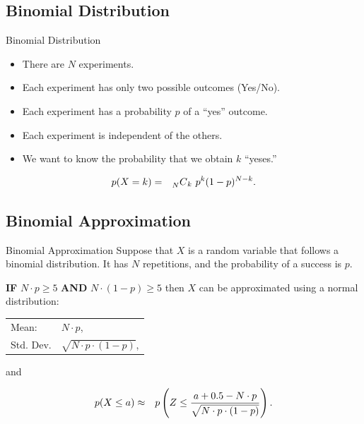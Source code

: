 \subsection{Binomial Distribution}

\begin{frame}{Binomial Distribution}

  \begin{definition}
    \begin{itemize}
    \item There are $N$ experiments.
    \item Each experiment has only two possible outcomes (Yes/No).
    \item Each experiment has a probability $p$ of a ``yes'' outcome.
    \item Each experiment is independent of the others.
    \item We want to know the probability that we obtain $k$ ``yeses.''
    \end{itemize}
    \begin{eqnarray*}
      p(X=k) & = & \prescript{~}{N}{C}_k ~ p^k (1-p)^{N-k}.
    \end{eqnarray*}
  \end{definition}

\end{frame}

\subsection{Binomial Approximation}


\begin{frame}

  \begin{block}{Binomial Approximation}
    Suppose that $X$ is a random variable that follows a binomial
    distribution. It has $N$ repetitions, and the probability of a
    success is $p$. 

    \textbf{IF} $N\cdot p\geq 5$ \textbf{AND} $N\cdot (1-p) \geq 5$
    then $X$ can be approximated using a normal distribution:

    \begin{center}
      \begin{tabular}{ll}
        Mean: & $N\cdot p$, \\
        Std. Dev. & $\sqrt{N\cdot p \cdot (1-p)}$,
      \end{tabular}
    \end{center}

    and

    \begin{eqnarray*}
      p(X \leq a) & \approx &
       p\left( Z \leq \frac{a+0.5-N\cdot p}{\sqrt{N\cdot p \cdot (1-p)}}\right).
    \end{eqnarray*}

  \end{block}

\end{frame}

